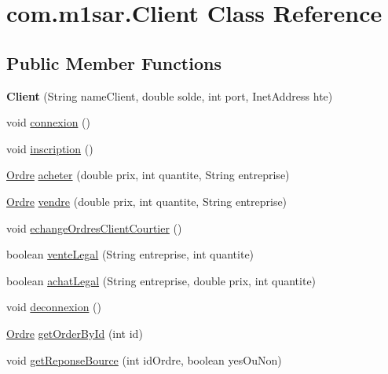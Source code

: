 \hypertarget{classcom_1_1m1sar_1_1_client}{}\section{com.\+m1sar.\+Client Class Reference}
\label{classcom_1_1m1sar_1_1_client}
\subsection*{Public Member Functions}
\begin{DoxyCompactItemize}
\item 
\mbox{\label{classcom_1_1m1sar_1_1_client_af679443c7353bb7bbd197cf94049a70c}} 
{\bfseries Client} (String name\+Client, double solde, int port, Inet\+Address hte)
\item 
void \hyperlink{classcom_1_1m1sar_1_1_client_aeff9ee8926647a8be490c5f0beea31d5}{connexion} ()
\item 
void \hyperlink{classcom_1_1m1sar_1_1_client_ac6681e529e1a045aae86e571dbfea5e3}{inscription} ()
\item 
\hyperlink{classcom_1_1m1sar_1_1_ordre}{Ordre} \hyperlink{classcom_1_1m1sar_1_1_client_a7042e50f398b3b9b7bbeada8f12954c2}{acheter} (double prix, int quantite, String entreprise)
\item 
\hyperlink{classcom_1_1m1sar_1_1_ordre}{Ordre} \hyperlink{classcom_1_1m1sar_1_1_client_ac7c456af1862320de2c394a23a7d80cd}{vendre} (double prix, int quantite, String entreprise)
\item 
void \hyperlink{classcom_1_1m1sar_1_1_client_a661a6a21b9891b99319d45fe1bb7c0c9}{echange\+Ordres\+Client\+Courtier} ()
\item 
boolean \hyperlink{classcom_1_1m1sar_1_1_client_a193f812c6df9bd999c444eb3ec5007da}{vente\+Legal} (String entreprise, int quantite)
\item 
boolean \hyperlink{classcom_1_1m1sar_1_1_client_a9ab9d2ee49a49ffc34d876c554bf29b3}{achat\+Legal} (String entreprise, double prix, int quantite)
\item 
void \hyperlink{classcom_1_1m1sar_1_1_client_adbad3a491bebe1acf093c0c6343ec507}{deconnexion} ()
\item 
\hyperlink{classcom_1_1m1sar_1_1_ordre}{Ordre} \hyperlink{classcom_1_1m1sar_1_1_client_a29230c6248c0b37d1faeb254270f0001}{get\+Order\+By\+Id} (int id)
\item 
void \hyperlink{classcom_1_1m1sar_1_1_client_a78ef39501ca822bcd7df390bead5baae}{get\+Reponse\+Bource} (int id\+Ordre, boolean yes\+Ou\+Non)

\end{DoxyCompactItemize}
